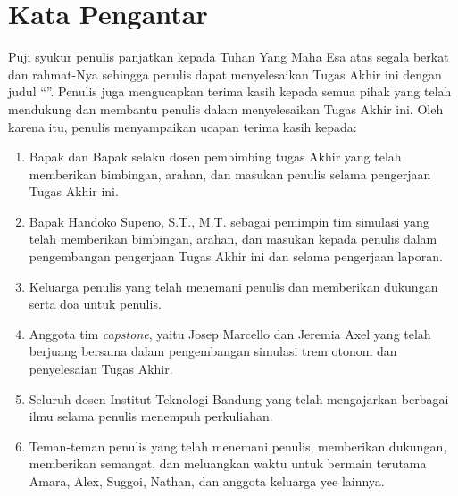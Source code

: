 \chapter*{Kata Pengantar}

Puji syukur penulis panjatkan kepada Tuhan Yang Maha Esa atas segala berkat dan
rahmat-Nya sehingga penulis dapat menyelesaikan Tugas Akhir ini dengan judul
``\thetitle''. Penulis juga mengucapkan terima kasih kepada semua pihak yang
telah mendukung dan membantu penulis dalam menyelesaikan Tugas Akhir ini.
Oleh karena itu, penulis menyampaikan ucapan terima kasih kepada:

\begin{enumerate}
	\item Bapak \advisoronename dan Bapak \advisortwoname selaku dosen
	pembimbing tugas Akhir yang telah memberikan bimbingan, arahan, dan masukan
	penulis selama pengerjaan Tugas Akhir ini.
	\item Bapak Handoko Supeno, S.T., M.T. sebagai pemimpin tim simulasi yang
	telah memberikan bimbingan, arahan, dan masukan kepada penulis dalam
	pengembangan pengerjaan Tugas Akhir ini dan selama pengerjaan laporan.
	\item Keluarga penulis yang telah menemani penulis dan memberikan dukungan
	serta doa untuk penulis.
	\item Anggota tim \textit{capstone}, yaitu Josep Marcello dan Jeremia Axel
	yang telah berjuang bersama dalam pengembangan simulasi trem otonom dan
	penyelesaian Tugas Akhir.
	\item Seluruh dosen Institut Teknologi Bandung yang telah mengajarkan berbagai
	ilmu selama penulis menempuh perkuliahan.
	\item Teman-teman penulis yang telah menemani penulis, memberikan dukungan,
	memberikan semangat, dan meluangkan waktu untuk bermain terutama Amara,
	Alex, Suggoi, Nathan, dan anggota keluarga yee lainnya.
\end{enumerate}



\clearpage
